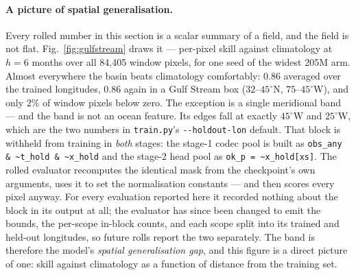 \documentclass[10pt]{article}
\begin{document}
\paragraph{A picture of spatial generalisation.} Every rolled number in
this section is a scalar summary of a field, and the field is not flat.
Fig.~\ref{fig:gulfstream} draws it --- per-pixel skill against
climatology at $h{=}6$ months over all 84{,}405 window pixels, for one
seed of the widest 205M arm. Almost everywhere the basin beats
climatology comfortably: $0.86$ averaged over the trained longitudes,
$0.86$ again in a Gulf Stream box ($32$--$45^\circ$N,
$75$--$45^\circ$W), and only $2\%$ of window pixels below zero. The
exception is a single meridional band --- and the band is not an ocean
feature. Its edges fall at exactly $45^\circ$W and $25^\circ$W, which
are the two numbers in \texttt{train.py}'s \texttt{-{}-holdout-lon}
default. That block is withheld from training in \emph{both} stages: the
stage-1 codec pool is built as
\texttt{obs\_any\,\&\,\textasciitilde{}t\_hold\,\&\,\textasciitilde{}x\_hold}
and the stage-2 head pool as
\texttt{ok\_p\,=\,\textasciitilde{}x\_hold[xs]}. The rolled evaluator
recomputes the identical mask from the checkpoint's own arguments, uses
it to set the normalisation constants --- and then scores every pixel
anyway. For every evaluation reported here it recorded nothing about the
block in its output at all; the evaluator has since been changed to emit
the bounds, the per-scope in-block counts, and each scope split into its
trained and held-out longitudes, so future rolls report the two
separately. The
band is therefore the model's \emph{spatial generalisation gap}, and
this figure is a direct picture of one: skill against climatology as a
function of distance from the training set.
\end{document}

